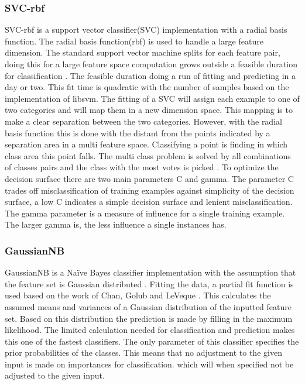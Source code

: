 \documentclass[a4paper,10pt]{article}
\begin{document}
\subsubsection{SVC-rbf}
SVC-rbf is a support vector classifier(SVC) implementation with a radial basis function. The radial basis function(rbf) is used to handle a large feature dimension. The standard support vector machine splits for each feature pair, doing this for a large feature space computation grows outside a feasible duration for classification \cite{SVN}. The feasible duration doing a run of fitting and predicting in a day or two. This fit time is quadratic with the number of samples based on the implementation of libsvm\cite{SVM}. The fitting of a SVC will assign each example to one of two categories and will map them in a new dimension space. This mapping is to make a clear separation between the two categories. However, with the radial basis function this is done with the distant from the points indicated by a separation area in a multi feature space. Classifying a point is finding in which class area this point falls. The multi class problem is solved by  all combinations of classes pairs and the class with the most votes is picked \cite{Multi-pair-coup}. To optimize the decision surface there are two main parameters C and gamma. The parameter C trades off misclassification of training examples against simplicity of the decision surface, a low C indicates a simple decision surface and lenient misclassification. The gamma parameter is a measure of influence for a single training example. The larger gamma is, the less influence a single instances has.

\subsubsection{GaussianNB}
GaussianNB is a Naïve Bayes classifier implementation with the  assumption that the feature set is Gaussian distributed \cite{Bayes}. Fitting the data, a partial fit function is used based on the work of Chan, Golub and LeVeque \cite{Sam-var}. This calculates the assumed means and variances of a Gaussian distribution of the inputted feature set. Based on this distribution the prediction is made by filling in the maximum likelihood. The limited calculation needed for classification and prediction makes this one of the fastest classifiers. The only parameter of this classifier specifies the prior probabilities of the classes. This means that no adjustment to the given input is made on importances for classification. which will when specified not be adjusted to the given input. 
\end{document}
